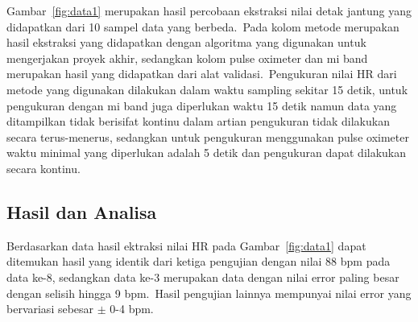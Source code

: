 Gambar~\ref{fig:data1} merupakan hasil percobaan ekstraksi nilai detak jantung yang didapatkan dari 10 sampel data yang berbeda.~Pada kolom metode merupakan hasil ekstraksi yang didapatkan dengan algoritma yang digunakan untuk mengerjakan proyek akhir, sedangkan kolom pulse oximeter dan mi band merupakan hasil yang didapatkan dari alat validasi.~Pengukuran nilai HR dari metode yang digunakan dilakukan dalam waktu sampling sekitar 15 detik, untuk pengukuran dengan mi band juga diperlukan waktu 15 detik namun data yang ditampilkan tidak berisifat kontinu dalam artian pengukuran tidak dilakukan secara terus-menerus, sedangkan untuk pengukuran menggunakan pulse oximeter waktu minimal yang diperlukan adalah 5 detik dan pengukuran dapat dilakukan secara kontinu.

\subsection{Hasil dan Analisa}
Berdasarkan data hasil ektraksi nilai HR pada Gambar~\ref{fig:data1} dapat ditemukan hasil yang identik dari ketiga pengujian dengan nilai 88 bpm pada data ke-8, sedangkan data ke-3 merupakan data dengan nilai error paling besar dengan selisih hingga 9 bpm.~Hasil pengujian lainnya mempunyai nilai error yang bervariasi sebesar \(\pm\) 0-4 bpm.
